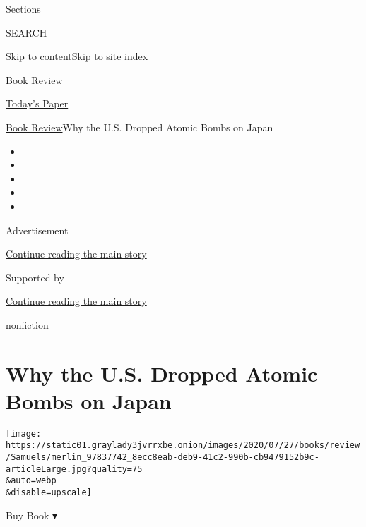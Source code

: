 Sections

SEARCH

\protect\hyperlink{site-content}{Skip to
content}\protect\hyperlink{site-index}{Skip to site index}

\href{https://www.nytimes3xbfgragh.onion/section/books/review}{Book
Review}

\href{https://myaccount.nytimes3xbfgragh.onion/auth/login?response_type=cookie\&client_id=vi}{}

\href{https://www.nytimes3xbfgragh.onion/section/todayspaper}{Today's
Paper}

\href{/section/books/review}{Book Review}\textbar{}Why the U.S. Dropped
Atomic Bombs on Japan

\begin{itemize}
\item
\item
\item
\item
\item
\end{itemize}

Advertisement

\protect\hyperlink{after-top}{Continue reading the main story}

Supported by

\protect\hyperlink{after-sponsor}{Continue reading the main story}

nonfiction

\hypertarget{why-the-us-dropped-atomic-bombs-on-japan}{%
\section{Why the U.S. Dropped Atomic Bombs on
Japan}\label{why-the-us-dropped-atomic-bombs-on-japan}}

\texttt{[image: https://static01.graylady3jvrrxbe.onion/images/2020/07/27/books/review/Samuels/merlin\_97837742\_8ecc8eab-deb9-41c2-990b-cb9479152b9c-articleLarge.jpg?quality=75\\\&auto=webp\\\&disable=upscale]}

Buy Book ▾

